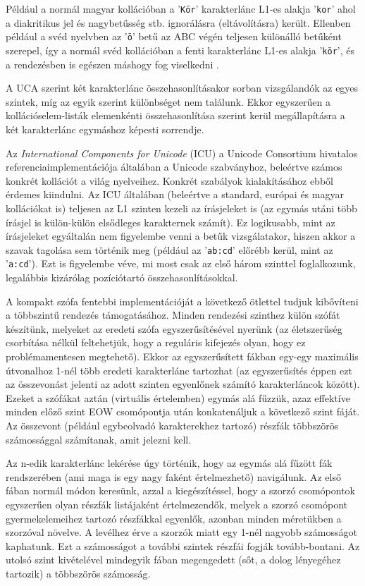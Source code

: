 \documentclass[
    parspace,
    noindent,
    nohyp,
]{elteiktdk}[2023/04/10]
\newcommand{\todoref}[1]{\todo[inline, noinlinepar, color=red, textcolor=white, inlinewidth=0.6cm, caption={#1}]{\large \textbf{×}}}
\begin{document}
Például a normál magyar kollációban a '\texttt{Kör}' karakterlánc L1-es alakja '\texttt{kor}'
ahol a diakritikus jel és nagybetűsség stb. ignorálásra (eltávolításra) került.
Ellenben például a svéd nyelvben az '\texttt{ö}' betű az ABC végén
teljesen különálló betűként szerepel,
így a normál svéd kollációban a fenti karakterlánc L1-es alakja '\texttt{kör}',
és a rendezésben is egészen máshogy fog viselkedni%
\cite{UCA2024SvCollation}.

A UCA szerint két karakterlánc összehasonlításakor sorban vizsgálandók az egyes szintek,
míg az egyik szerint különbséget nem találunk.
Ekkor egyszerűen a kollációselem-listák elemenkénti összehasonlítása szerint
kerül megállapításra a két karakterlánc egymáshoz képesti sorrendje.

Az \textit{International Components for Unicode} (ICU) a Unicode Consortium hivatalos
referenciaimplementációja általában a Unicode szabványhoz,
beleértve számos konkrét kollációt a világ nyelveihez\protect\cite{ICU2024}.
Konkrét szabályok kialakításához ebből érdemes kiindulni.
Az ICU általában (beleértve a standard, európai és magyar kollációkat is)
teljesen az L1 szinten kezeli az írásjeleket is
(az egymás utáni több írásjel is külön-külön elsődleges karakternek számít).
Ez logikusabb, mint az írásjeleket egyáltalán nem figyelembe venni a betűk vizsgálatakor,
hiszen akkor a szavak tagolása sem történik meg
(például az '\texttt{ab:cd}' előrébb kerül, mint az '\texttt{a:cd}').
Ezt is figyelembe véve, mi most csak az első három szinttel foglalkozunk,
legalábbis kizárólag pozíciótartó összehasonlításokkal.

A kompakt szófa fentebbi implementációját a következő ötlettel tudjuk kibővíteni
a többszintű rendezés támogatásához.
Minden rendezési szinthez külön szófát készítünk, melyeket az eredeti szófa egyszerűsítésével nyerünk
(az életszerűség csorbítása nélkül feltehetjük,
hogy a reguláris kifejezés olyan, hogy ez problémamentesen megtehető).
Ekkor az egyszerűsített fákban egy-egy maximális útvonalhoz 1-nél több eredeti karakterlánc tartozhat
(az egyszerűsítés éppen ezt az összevonást jelenti
az adott szinten egyenlőnek számító karakterláncok között).
Ezeket a szófákat aztán (virtuális értelemben) egymás alá fűzzük,
azaz effektíve minden előző szint EOW csomópontja után konkatenáljuk a következő szint fáját.
Az összevont (például egybeolvadó karakterekhez tartozó) részfák
többszörös számossággal számítanak, amit jelezni kell.

Az n-edik karakterlánc lekérése úgy történik,
hogy az egymás alá fűzött fák rendszerében (ami maga is egy nagy faként értelmezhető) navigálunk.
Az első fában normál módon keresünk, azzal a kiegészítéssel,
hogy a szorzó csomópontok egyszerűen olyan részfák listájaként értelmezendők,
melyek a szorzó csomópont gyermekelemeihez tartozó részfákkal egyenlők,
azonban minden méretükben a szorzóval növelve.
A levélhez érve a szorzók miatt egy 1-nél nagyobb számosságot kaphatunk.
Ezt a számosságot a további szintek részfái fogják tovább-bontani.
Az utolsó szint kivételével mindegyik fában megengedett (sőt, a dolog lényegéhez tartozik)
a többszörös számosság.
\todoref{Az egymás alá fűzött szófákhoz esetleg ábra}
\end{document}
